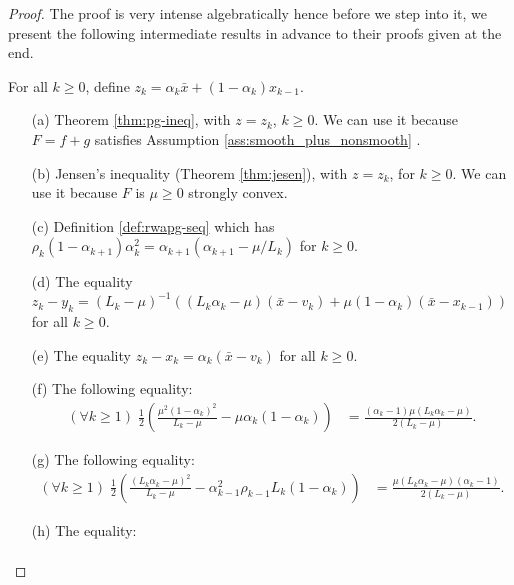 \documentclass[12pt]{article}
\begin{document}
        \begin{proof}
            The proof is very intense algebratically hence before we step into it, we present the following intermediate results in advance to their proofs given at the end. 
            \par
            For all $k \ge 0$, define $z_k = \alpha_k \bar x + (1 - \alpha_k)x_{k - 1}$. 
            \begin{itemize}
                \item [(a)] Theorem \ref{thm:pg-ineq}, with $z = z_k$, $k \ge 0$. We can use it because $F = f + g$ satisfies Assumption \ref{ass:smooth_plus_nonsmooth} . 
                \item [(b)] Jensen's inequality (Theorem \ref{thm:jesen}), with $z = z_k$, for $k \ge 0$. We can use it because $F$ is $\mu \ge 0$ strongly convex. 
                \item [(c)] Definition \ref{def:rwapg-seq} which has $\rho_k(1 - \alpha_{k + 1})\alpha_k^2 = \alpha_{k + 1}(\alpha_{k + 1} - \mu/L_k)$ for $k \ge 0$.
                \item [(d)] The equality $z_k - y_k = (L_k - \mu)^{-1}((L_k\alpha_k - \mu)(\bar x - v_k) + \mu(1 - \alpha_k)(\bar x - x_{k - 1}))$ for all $k \ge 0$. 
                \item [(e)] The equality $z_k - x_k = \alpha_k(\bar x - v_k)$ for all $k \ge 0$. 
                \item [(f)] The following equality: 
                \begin{align*}
                    (\forall k \ge 1)\; \frac{1}{2}\left(
                        \frac{\mu^2(1 - \alpha_k)^2}{L_k - \mu} - \mu \alpha_k(1 - \alpha_k)
                    \right) &= 
                    \frac{(\alpha_k - 1)\mu(L_k\alpha_k - \mu)}{2(L_k - \mu)}. 
                \end{align*}
                \item [(g)] The following equality: 
                \begin{align*}
                    (\forall k \ge 1)\; 
                    \frac{1}{2}\left(
                        \frac{(L_k\alpha_k - \mu)^2}{L_k - \mu} - 
                        \alpha_{k - 1}^2\rho_{k - 1}L_k(1 - \alpha_k)
                    \right)
                    &= 
                    \frac{\mu(L_k\alpha_k - \mu)(\alpha_k - 1)}{2(L_k - \mu)}. 
                \end{align*}
                \item [(h)] The equality: 
                \begin{align*}

\end{align*}
\end{itemize}
\end{proof}
\end{document}
